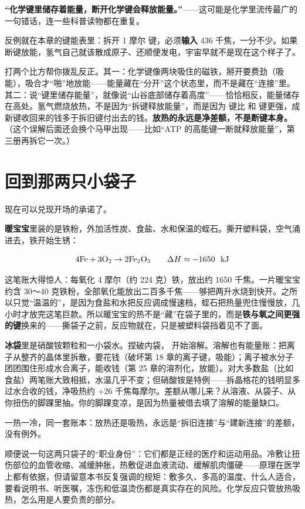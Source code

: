\begin{wuqu}
\textbf{“化学键里储存着能量，断开化学键会释放能量。”}——这可能是化学里流传最广的一句错话，连一些科普读物都在重复。

反例就在本章的键能表里：拆开 1 摩尔  键，必须\textbf{输入} 436 千焦，一分不少。如果断键放能，氢气自己就该散成原子、还顺便发电，宇宙早就不是现在这个样子了。

打两个比方帮你拨乱反正。其一：化学键像两块吸住的磁铁，掰开要费劲（吸能），吸合才“啪”地放能——能量藏在“分开”这个状态里，而不是藏在“连接”里。其二：说“键里储存能量”，就像说“山谷底部储存着高度”——恰恰相反，能量储存在高处。氢气燃烧放热，不是因为“拆键释放能量”，而是因为  键比  和  键更强，成新键收回来的钱多于拆旧键付出去的钱。\textbf{放热的永远是净差额，不是断键本身。}（这个误解后面还会换个马甲出现——比如“ATP 的高能键一断就释放能量”，第三册再拆它一次。）
\end{wuqu}

\section{回到那两只小袋子}

现在可以兑现开场的承诺了。

\textbf{暖宝宝}里装的是铁粉，外加活性炭、食盐、水和保温的蛭石。撕开塑料袋，空气涌进去，铁开始生锈：

\[ \mathrm{4Fe} + \mathrm{3O_2} \rightarrow \mathrm{2Fe_2O_3} \qquad \Delta H \approx -1650\ \ \mathrm{kJ} \]

这笔账大得惊人：每氧化 4 摩尔（约 224 克）铁，放出约 1650 千焦。一片暖宝宝约含 30～40 克铁粉，全部氧化能放出二百多千焦——够把两升水烧到快开。之所以只觉“温温的”，是因为食盐和水把反应调成慢速档，蛭石把热量兜住慢慢放，几小时才放完这笔巨款。所以暖宝宝的热不是“藏”在袋子里的，而是\textbf{铁与氧之间更强的键}换来的——撕袋子之前，反应物就在，只是被塑料袋挡着见不了面。

\textbf{冰袋}里是硝酸铵颗粒和一小袋水。捏破内袋， 开始溶解。溶解也有能量账：把离子从整齐的晶体里拆散，要花钱（破坏第 18 章的离子键，吸能）；离子被水分子团团围住形成水合离子，能收钱（第 25 章的溶剂化，放能）。对大多数盐（比如食盐）两笔账大致相抵，水温几乎不变；但硝酸铵是特例——拆晶格花的钱明显多过水合收的钱，净吸热约 $+26$ 千焦每摩尔。差额从哪儿来？从溶液、从袋子、从你扭伤的脚踝里抽。你的脚踝变凉，是因为热量被借去填了溶解的能量缺口。

一热一冷，同一套账本：放热还是吸热，永远是“拆旧连接”与“建新连接”的差额，没有例外。

顺便说一句这两只袋子的“职业身份”：它们都是正经的医疗和运动用品。冷敷让扭伤部位的血管收缩、减缓肿胀，热敷促进血液流动、缓解肌肉僵硬——原理在医学上都有依据，但请留意本书反复强调的规矩：敷多久、多高的温度、什么人适合，要看说明书、听医嘱，冻伤和低温烫伤都是真实存在的风险。化学反应只管放热吸热，怎么用是人要负责的部分。

